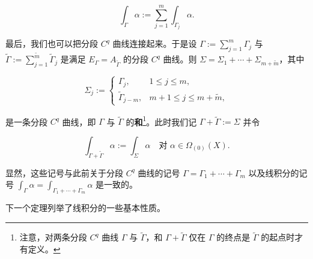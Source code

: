 \[
\int_{\Gamma}\alpha:=\sum_{j=1}^{m}\int_{\Gamma_j}\alpha .
\]

最后，我们也可以把分段 $ C^{q} $ 曲线连接起来。于是设 $ \Gamma:=\sum_{j=1}^{m}\Gamma_j $ 与 $ \tilde{\Gamma}:=\sum_{j=1}^{\tilde{m}}\tilde{\Gamma}_j $ 是满足 $ E_{\Gamma}=A_{\tilde{\Gamma}} $ 的分段 $ C^{q} $ 曲线。则 $ \Sigma=\Sigma_1+\cdots+\Sigma_{m+\tilde{m}} $，其中

\begin{equation*}
\Sigma_j:=\begin{cases}\Gamma_j , & 1\le j\le m ,\\ \tilde{\Gamma}_{j-m} , & m+1\le j\le m+\tilde{m} ,\end{cases}
\end{equation*}

是一条分段 $ C^{q} $ 曲线，即 $ \Gamma $ 与 $ \tilde{\Gamma} $ 的\textbf{和}\footnote{注意，对两条分段 $ C^{q} $ 曲线 $ \Gamma $ 与 $ \tilde{\Gamma} $，和 $ \Gamma+\tilde{\Gamma} $ 仅在 $ \Gamma $ 的终点是 $ \tilde{\Gamma} $ 的起点时才有定义。}。此时我们记 $ \Gamma+\tilde{\Gamma}:=\Sigma $ 并令

\[
\int_{\Gamma+\tilde{\Gamma}}\alpha:=\int_{\Sigma}\alpha\quad\text{对 }\alpha\in\Omega_{(0)}(X) .
\]

显然，这些记号与此前关于分段 $ C^{q} $ 曲线的记号 $ \Gamma=\Gamma_1+\cdots+\Gamma_m $ 以及线积分的记号 $ \int_{\Gamma}\alpha=\int_{\Gamma_1+\cdots+\Gamma_m}\alpha $ 是一致的。

下一个定理列举了线积分的一些基本性质。

